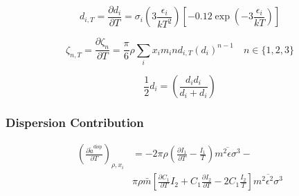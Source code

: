 \documentclass[12pt, letterpaper]{article}
\begin{document}
\begin{equation}
    d_{i,T}=\frac{\partial d_{i}}{\partial T}=\sigma_{i}\left(3\frac{\epsilon_{i}}{kT^2}\right)\left[-0.12\exp\left(-3\frac{\epsilon_{i}}{kT}\right)\right]
    \label{eq:d_segment_dT}
\end{equation}


\begin{equation}
    \zeta_{n,T}=\frac{\partial\zeta_{n}}{\partial T}=\frac{\pi}{6}\rho\sum_{i}x_{i}m_{i}nd_{i,T}\left(d_{i}\right)^{n-1}\quad n\in\{1,2,3\}
    \label{eq:zeta_n_dT}
\end{equation}


\begin{equation}
    \frac{1}{2}d_{i}=\left(\frac{d_{i}d_{i}}{d_{i}+d_{i}}\right)
    \label{eq:half_d_identity}
\end{equation}

\subsubsection{Dispersion Contribution}


\begin{equation}
    \begin{aligned}
        \left(\frac{\partial\tilde{a}^{\mathrm{disp}}}{\partial T}\right)_{\rho,x_{i}} & =-2\pi\rho\left(\frac{\partial I_{1}}{\partial T}-\frac{I_{1}}{T}\right)\overline{m^{2}\epsilon\sigma^{3}}- \\&\pi\rho\bar{m}\left[\frac{\partial C_{1}}{\partial T}I_{2}+C_{1}\frac{\partial I_{2}}{\partial T}-2C_{1}\frac{I_{2}}{T}\right]\overline{m^{2}\epsilon^{2}\sigma^{3}}
    \end{aligned}
    \label{eq:dares_disp_dT}
\end{equation}
\end{document}
